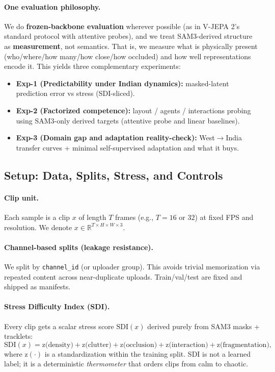 \vspace{3pt}
\paragraph{One evaluation philosophy.}
We do \textbf{frozen-backbone evaluation} wherever possible (as in V-JEPA 2’s standard protocol with attentive probes), and we treat SAM3-derived structure as \textbf{measurement}, not semantics. That is, we measure what is physically present (who/where/how many/how close/how occluded) and how well representations encode it. This yields three complementary experiments:
\begin{itemize}[leftmargin=*,itemsep=2pt]
  \item \textbf{Exp-1 (Predictability under Indian dynamics):} masked-latent prediction error vs stress (SDI-sliced).
  \item \textbf{Exp-2 (Factorized competence):} layout / agents / interactions probing using SAM3-only derived targets (attentive probe and linear baselines).
  \item \textbf{Exp-3 (Domain gap and adaptation reality-check):} West$\rightarrow$India transfer curves + minimal self-supervised adaptation and what it buys.
\end{itemize}

\subsection{Setup: Data, Splits, Stress, and Controls}
\label{sec:setup}

\paragraph{Clip unit.}
Each sample is a clip $x$ of length $T$ frames (e.g., $T{=}16$ or $32$) at fixed FPS and resolution. We denote $x \in \mathbb{R}^{T \times H \times W \times 3}$.

\paragraph{Channel-based splits (leakage resistance).}
We split by \texttt{channel\_id} (or uploader group). This avoids trivial memorization via repeated content across near-duplicate uploads. Train/val/test are fixed and shipped as manifests.

\paragraph{Stress Difficulty Index (SDI).}
Every clip gets a scalar stress score $\mathrm{SDI}(x)$ derived purely from SAM3 masks + tracklets:
\[
\mathrm{SDI}(x) = \mathrm{z}\big(\text{density}\big) + \mathrm{z}\big(\text{clutter}\big) + \mathrm{z}\big(\text{occlusion}\big) + \mathrm{z}\big(\text{interaction}\big) + \mathrm{z}\big(\text{fragmentation}\big),
\]
where $\mathrm{z}(\cdot)$ is a standardization within the training split. SDI is not a learned label; it is a deterministic \emph{thermometer} that orders clips from calm to chaotic.

